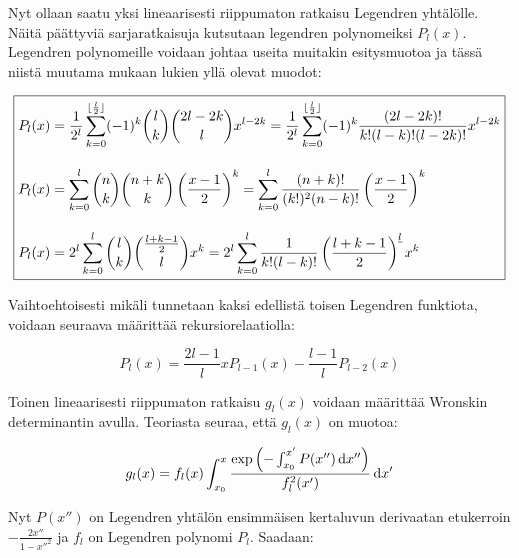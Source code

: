 \documentclass[../johdoksia.tex]{subfiles}
\begin{document}
	Nyt ollaan saatu yksi lineaarisesti riippumaton ratkaisu Legendren yhtälölle. Näitä päättyviä sarjaratkaisuja kutsutaan legendren polynomeiksi $P_l(x)$. Legendren polynomeille voidaan johtaa useita muitakin esitysmuotoa ja tässä niistä muutama mukaan lukien yllä olevat muodot:
	
	\begin{equation}
		\boxed{
		\begin{aligned}
			P_l(x) &= \frac{1}{2^l}\sum_{k = 0}^{\lfloor\frac{l}{2}\rfloor}(-1)^k\binom{l}{k}\binom{2l - 2k}{l}x^{l - 2k} = \frac{1}{2^l}\sum_{k = 0}^{\lfloor\frac{l}{2}\rfloor}(-1)^k\frac{(2l - 2k)!}{k!(l - k)!(l - 2k)!}x^{l - 2k} \\[1em]
			P_l(x) &= \sum_{k = 0}^{l}\binom{n}{k}\binom{n + k}{k}\left(\frac{x - 1}{2}\right)^k = \sum_{k = 0}^{l}\frac{(n + k)!}{(k!)^2(n - k)!}\left(\frac{x - 1}{2}\right)^k \\[1em]
			P_l(x) &= 2^l\sum_{k = 0}^{l}\binom{l}{k}\binom{\frac{l + k - 1}{2}}{l}x^k = 2^l\sum_{k = 0}^{l}\frac{1}{k!(l - k)!}\left(\frac{l + k - 1}{2}\right)^{\underline{l}}x^k
		\end{aligned}
		}
	\end{equation}

	Vaihtoehtoisesti mikäli tunnetaan kaksi edellistä toisen Legendren funktiota, voidaan seuraava määrittää rekursiorelaatiolla:
	
	\begin{equation}
		\boxed{P_l(x) = \frac{2l - 1}{l}xP_{l - 1}(x) - \frac{l - 1}{l}P_{l - 2}(x)}
	\end{equation}

	Toinen lineaarisesti riippumaton ratkaisu $g_l(x)$ voidaan määrittää Wronskin determinantin avulla. Teoriasta seuraa, että $g_l(x)$ on muotoa:
	
	\begin{equation*}
		g_l(x) = f_l(x)\int_{x_0}^{x}\frac{\exp\left(-\int_{x_0}^{x'}P(x'')\odif{x''}\right)}{f_l^2(x')}\odif{x'}
	\end{equation*}

	Nyt $P(x'')$ on Legendren yhtälön ensimmäisen kertaluvun derivaatan etukerroin $-\frac{2x''}{1 - x''^2}$ ja $f_l$ on Legendren polynomi $P_l$. Saadaan:
	
\end{document}
